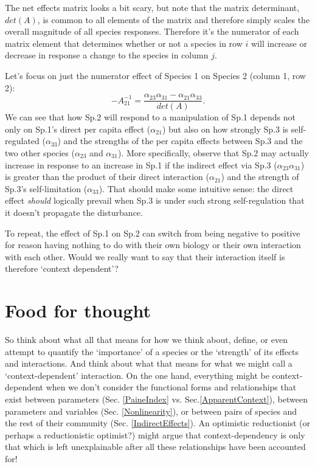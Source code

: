 \documentclass[10pt,letterpaper]{article}
\begin{document}
The net effects matrix looks a bit scary, but note that the matrix determinant, $det(A)$, is common to all elements of the matrix and therefore simply scales the overall magnitude of all species responses.  Therefore it's the numerator of each matrix element that determines whether or not a species in row $i$ will increase or decrease in response a change to the species in column $j$.

Let's focus on just the numerator effect of Species 1 on Species 2 (column 1, row 2):
\begin{equation*}
-A_{21}^{-1} = \frac{\alpha _{23} \alpha _{31}-\alpha _{21} \alpha _{33}}{det(A) }.
\end{equation*}
 We can see that how Sp.2 will respond to a manipulation of Sp.1 depends not only on Sp.1's direct per capita effect ($\alpha_{21}$) but also on how strongly Sp.3 is self-regulated ($\alpha_{33}$) and the strengths of the per capita effects between Sp.3 and the two other species ($\alpha_{23}$ and $\alpha_{31}$).  More specifically, observe that Sp.2 may actually increase in response to an increase in Sp.1 if the indirect effect via Sp.3 ($\alpha_{23} \alpha_{31}$) is greater than the product of their direct interaction ($\alpha_{21}$) and the strength of Sp.3's self-limitation ($\alpha_{33}$).  That should make some intuitive sense: the direct effect \emph{should} logically prevail when Sp.3 is under such strong self-regulation that it doesn't propagate the disturbance.  
 
 To repeat, the effect of Sp.1 on Sp.2 can switch from being negative to positive for reason having nothing to do with their own biology or their own interaction with each other.  Would we really want to say that their interaction itself is therefore `context dependent'?


\section{Food for thought}
So think about what all that means for how we think about, define, or even attempt to quantify the `importance' of a species or the `strength' of its effects and interactions.  And think about what that means for what we might call a `context-dependent' interaction.  On the one hand, everything might be context-dependent when we don't consider the  functional forms and relationships that exist  between parameters (Sec. \ref{PaineIndex} vs. Sec.\ref{ApparentContext}), between parameters and variables (Sec. \ref{Nonlinearity}), or between pairs of species and the rest of their community (Sec. \ref{IndirectEffects}).  An optimistic reductionist (or perhaps a reductionistic optimist?) might argue that context-dependency is only that which is left unexplainable after all these relationships have been accounted for!  
\end{document}
